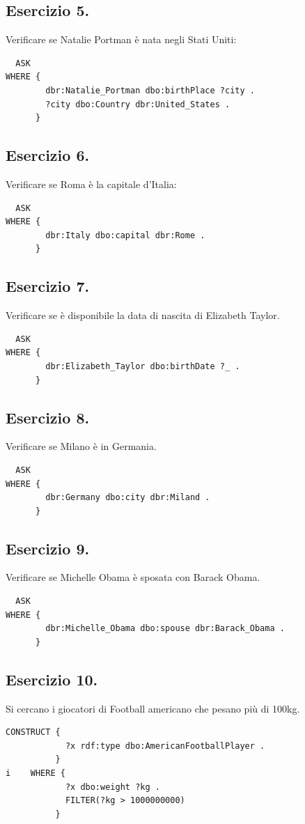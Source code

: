 \documentclass[11pt]{article}
\begin{document}
\subsection*{Esercizio 5.}
Verificare se Natalie Portman è nata negli Stati Uniti:
\begin{verbatim}
  ASK
WHERE {
        dbr:Natalie_Portman dbo:birthPlace ?city .
        ?city dbo:Country dbr:United_States .
      }
\end{verbatim}

\subsection*{Esercizio 6.}
Verificare se Roma è la capitale d'Italia:
\begin{verbatim}
  ASK 
WHERE {
        dbr:Italy dbo:capital dbr:Rome .
      }
\end{verbatim}

\subsection*{Esercizio 7.}
Verificare se è disponibile la data di nascita di Elizabeth Taylor.
\begin{verbatim}
  ASK
WHERE {
        dbr:Elizabeth_Taylor dbo:birthDate ?_ .
      }
\end{verbatim}

\subsection*{Esercizio 8.}
Verificare se Milano è in Germania.
\begin{verbatim}
  ASK
WHERE {
        dbr:Germany dbo:city dbr:Miland .
      }
\end{verbatim}

\subsection*{Esercizio 9.}
Verificare se Michelle Obama è sposata con Barack Obama.
\begin{verbatim}
  ASK
WHERE {
        dbr:Michelle_Obama dbo:spouse dbr:Barack_Obama .
      }
\end{verbatim}

\subsection*{Esercizio 10.}
Si cercano i giocatori di Football americano che pesano più di 100kg.
\begin{verbatim}
CONSTRUCT {
            ?x rdf:type dbo:AmericanFootballPlayer .
          }
i    WHERE {
            ?x dbo:weight ?kg .
            FILTER(?kg > 1000000000)
          }
\end{verbatim}
\end{document}
